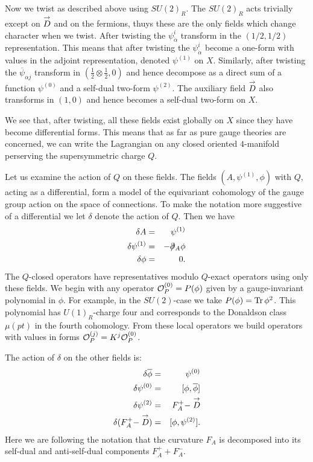 \documentclass[10pt]{article}
\def\cancel#1#2{\ooalign{$\hfil#1\mkern1mu/\hfil$\crcr$#1#2$}}
\def\dirac{\mathpalette\cancel\partial}
\def\ov{\overline}
\begin{document}
Now we twist as described above using $SU(2)_R$. The $SU(2)_R$
acts trivially except on $\buildrel\rightarrow\over D$ and on the
fermions, thuys these are the only fields which change character when
we twist.
After twisting the $\psi^i_{\dot\alpha}$ transform in the $(1/2,1/2)$
representation.  This means that after twisting the
$\psi^i_{\dot\alpha}$ become a one-form with values in the adjoint
representation,  denoted $\psi^{(1)}$  on
$X$. Similarly, after 
twisting the $\ov{\psi}_{\alpha j}$ transform in
$(\frac{1}{2}\otimes\frac{1}{2},0)$ and hence decompose as a direct
sum of a function $\psi^{(0)}$ and a self-dual two-form $\psi^{(2)}$. 
The auxiliary field $\buildrel\rightarrow\over D$ also transforms in
$(1,0)$ and hence becomes a self-dual two-form on $X$.

We see that, after
twisting, all these fields exist globally on $X$ since they have
become differential forms. 
This means that as far as pure gauge theories are concerned, we can
write the Lagrangian on any closed oriented $4$-manifold perserving
the supersymmetric charge $Q$.

Let us examine the action of $Q$ on these fields.
The fields $(A,\psi^{(1)},\phi)$ with $Q$, acting as a differential, form a
model of the equivariant cohomology of the gauge group action on the
space of connections.  To make the notation more suggestive of a
differential we let $\delta$ denote the action of $Q$.
Then we have 
\begin{eqnarray*}
\delta A & = & \psi^{(1)} \\
\delta\psi^{(1)} & = & -\dirac_A\phi \\
\delta \phi & = & 0. 
\end{eqnarray*}
The $Q$-closed operators have representatives modulo $Q$-exact
operators using only these fields.
We begin with any operator ${\cal
O}_P^{(0)}=P(\phi)$ given by a 
gauge-invariant polynomial in $\phi$. For example, in the $SU(2)$-case
we take $P(\phi)={\rm Tr}\,\phi^2$. This polynomial has $U(1)_R$-charge four
and corresponds to the Donaldson class $\mu(pt)$ in the fourth
cohomology. From these local operators we build operators with values
in forms ${\cal O}_P^{(j)}=K^j{\cal O}_P^{(0)}$.

The action of $\delta$ on the other fields is:
\begin{eqnarray*}
\delta \ov{\phi} & = & \psi^{(0)} \\
\delta \psi^{(0)} & = & [\phi,\ov{\phi}] \\
\delta\psi^{(2)} & = & F^+_A-\buildrel\rightarrow\over D \\
\delta(F^+_A-\buildrel\rightarrow\over D) & = & [\phi,\psi^{(2)}].
\end{eqnarray*}
Here we are following the notation that the curvature $F_A$ is decomposed
into its self-dual and anti-self-dual components $F^+_A+F^-_A$.
\end{document}
